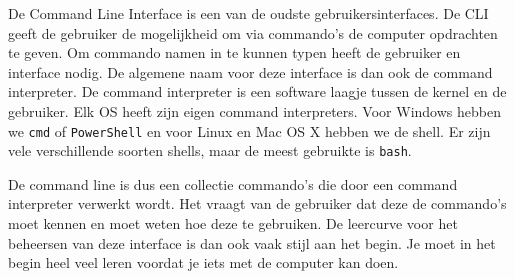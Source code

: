 De Command Line Interface is een van de oudste gebruikersinterfaces. De CLI geeft de gebruiker de mogelijkheid om via commando's de computer opdrachten te geven. Om commando namen in te kunnen typen heeft de gebruiker en interface nodig. De algemene naam voor deze interface is dan ook de command interpreter. De command interpreter is een software laagje tussen de kernel en de gebruiker. Elk OS heeft zijn eigen command interpreters. Voor Windows hebben we \texttt{cmd} of \texttt{PowerShell} en voor Linux en Mac OS X hebben we de shell. Er zijn vele verschillende soorten shells, maar de meest gebruikte is \texttt{bash}.

De command line is dus een collectie commando's die door een command interpreter verwerkt wordt. Het vraagt van de gebruiker dat deze de commando's moet kennen en moet weten hoe deze te gebruiken. De leercurve voor het beheersen van deze interface is dan ook vaak stijl aan het begin. Je moet in het begin heel veel leren voordat je iets met de computer kan doen.

